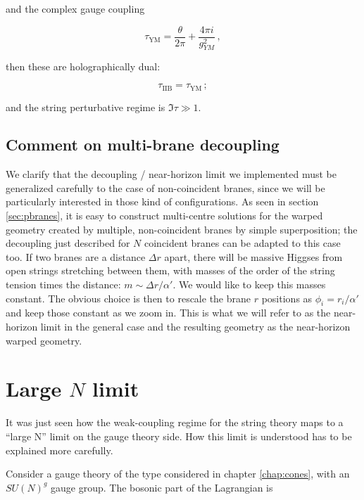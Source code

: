 and the complex gauge coupling

\begin{equation}
	\tau_\mathrm{YM} = \frac{\theta}{2\pi} + \frac{4\pi i}{g_{YM}^2}\,,
	\label{}
\end{equation}

then these are holographically dual:

\begin{equation}
	\tau_\mathrm{IIB} = \tau_\mathrm{YM}\,;
	\label{}
\end{equation}

and the string perturbative regime is $\Im \tau \gg 1$.

\subsection{Comment on multi-brane decoupling}

We clarify that the decoupling / near-horizon limit we implemented must be generalized carefully to the case of non-coincident branes, since we will be particularly interested in those kind of configurations. As seen in section \ref{sec:pbranes}, it is easy to construct multi-centre solutions for the warped geometry created by multiple, non-coincident branes by simple superposition; the decoupling just described for $N$ coincident branes can be adapted to this case too. If two branes are a distance $\Delta r$ apart, there will be massive Higgses from open strings stretching between them, with masses of the order of the string tension times the distance: $m \sim \Delta r / \alpha'$. We would like to keep this masses constant. The obvious choice is then to rescale the brane $r$ positions as $\phi_i = r_i / \alpha'$ and keep those constant as we zoom in. This is what we will refer to as the near-horizon limit in the general case and the resulting geometry as the near-horizon warped geometry.\\

\section{Large $N$ limit}

It was just seen how the weak-coupling regime for the string theory maps to a ``large N'' limit on the gauge theory side. How this limit is understood has to be explained more carefully.

Consider a gauge theory of the type considered in chapter \ref{chap:cones}, with an $SU(N)^g$ gauge group. The bosonic part of the Lagrangian is

